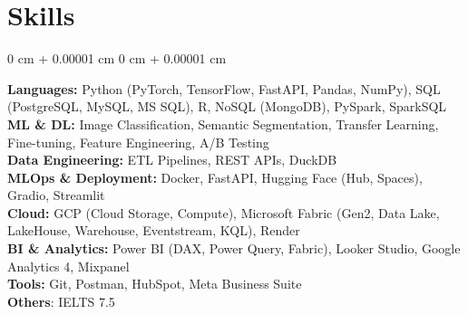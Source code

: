 \documentclass[10pt, letterpaper]{article}
\newenvironment{onecolentry}{
    \begin{adjustwidth}{
        0 cm + 0.00001 cm
    }{
        0 cm + 0.00001 cm
    }
}{
    \end{adjustwidth}
}
\newenvironment{twocolentry}[2][]{
    \onecolentry
    \def\secondColumn{#2}
    \setcolumnwidth{\fill, 4.5 cm}
    \begin{paracol}{2}
}{
    \switchcolumn \raggedleft \secondColumn
    \end{paracol}
    \endonecolentry
}
\begin{document}

\section{Skills}
\begin{onecolentry}
\textbf{Languages:} Python (PyTorch, TensorFlow, FastAPI, Pandas, NumPy), SQL (PostgreSQL, MySQL, MS SQL), R, NoSQL (MongoDB), PySpark, SparkSQL \\[0.1cm]
\textbf{ML \& DL:} Image Classification, Semantic Segmentation, Transfer Learning, Fine-tuning, Feature Engineering, A/B Testing \\[0.1cm]
\textbf{Data Engineering:} ETL Pipelines, REST APIs, DuckDB \\[0.1cm]
\textbf{MLOps \& Deployment:} Docker, FastAPI, Hugging Face (Hub, Spaces), Gradio, Streamlit \\[0.1cm]
\textbf{Cloud:} GCP (Cloud Storage, Compute), Microsoft Fabric (Gen2, Data Lake, LakeHouse, Warehouse, Eventstream, KQL), Render \\[0.1cm]
\textbf{BI \& Analytics:} Power BI (DAX, Power Query, Fabric), Looker Studio, Google Analytics 4, Mixpanel \\[0.1cm]
\textbf{Tools:} Git, Postman, HubSpot, Meta Business Suite \\[0.1cm]
\textbf{Others}: IELTS 7.5
\end{onecolentry}

\end{document}
